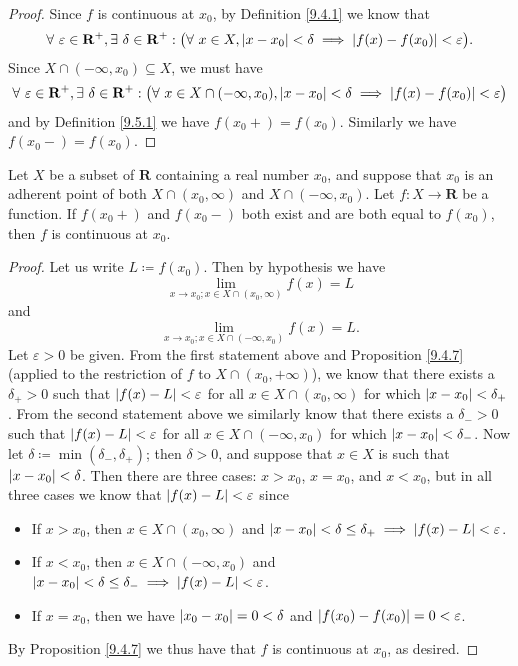 \begin{proof}
    Since \(f\) is continuous at \(x_0\), by Definition \ref{9.4.1} we know that
    \[
        \forall\ \varepsilon \in \mathbf{R}^+, \exists\ \delta \in \mathbf{R}^+ : \big(\forall\ x \in X, \abs*{x - x_0} < \delta \implies \abs*{f(x) - f(x_0)} < \varepsilon\big).
    \]
    Since \(X \cap (-\infty, x_0) \subseteq X\), we must have
    \[
        \forall\ \varepsilon \in \mathbf{R}^+, \exists\ \delta \in \mathbf{R}^+ : \big(\forall\ x \in X \cap (-\infty, x_0), \abs*{x - x_0} < \delta \implies \abs*{f(x) - f(x_0)} < \varepsilon\big)
    \]
    and by Definition \ref{9.5.1} we have \(f(x_0+) = f(x_0)\).
    Similarly we have \(f(x_0-) = f(x_0)\).
\end{proof}

\setcounter{theorem}{2}
\begin{proposition}\label{9.5.3}
    Let \(X\) be a subset of \(\mathbf{R}\) containing a real number \(x_0\), and suppose that \(x_0\) is an adherent point of both \(X \cap (x_0, \infty)\) and \(X \cap (-\infty, x_0)\).
    Let \(f : X \to \mathbf{R}\) be a function.
    If \(f(x_0+)\) and \(f(x_0-)\) both exist and are both equal to \(f(x_0)\), then \(f\) is continuous at \(x_0\).
\end{proposition}

\begin{proof}
    Let us write \(L \coloneqq f(x_0)\).
    Then by hypothesis we have
    \[
        \lim_{x \to x_0 ; x \in X \cap (x_0, \infty)} f(x) = L
    \]
    and
    \[
        \lim_{x \to x_0 ; x \in X \cap (-\infty, x_0)} f(x) = L.
    \]
    Let \(\varepsilon > 0\) be given.
    From the first statement above and Proposition \ref{9.4.7} (applied to the restriction of \(f\) to \(X \cap (x_0, +\infty)\)), we know that there exists a \(\delta_+ > 0\) such that \(\abs*{f(x) - L} < \varepsilon\) for all \(x \in X \cap(x_0, \infty)\) for which \(\abs*{x - x_0} < \delta_+\).
    From the second statement above we similarly know that there exists a \(\delta_- > 0\) such that \(\abs*{f(x) - L} < \varepsilon\) for all \(x \in X \cap (-\infty, x_0)\) for which \(\abs*{x - x_0} < \delta_-\).
    Now let \(\delta \coloneqq \min(\delta_-, \delta_+)\);
    then \(\delta > 0\), and suppose that \(x \in X\) is such that \(\abs*{x - x_0} < \delta\).
    Then there are three cases:
    \(x > x_0\), \(x = x_0\), and \(x < x_0\), but in all three cases we know that \(\abs*{f(x) - L} < \varepsilon\) since
    \begin{itemize}
        \item If \(x > x_0\), then \(x \in X \cap (x_0, \infty)\) and \(\abs*{x - x_0} < \delta \leq \delta_+ \implies \abs*{f(x) - L} < \varepsilon\).
        \item If \(x < x_0\), then \(x \in X \cap (-\infty, x_0)\) and \(\abs*{x - x_0} < \delta \leq \delta_- \implies \abs*{f(x) - L} < \varepsilon\).
        \item If \(x = x_0\), then we have \(\abs*{x_0 - x_0} = 0 < \delta\) and \(\abs*{f(x_0) - f(x_0)} = 0 < \varepsilon\).
    \end{itemize}
    By Proposition \ref{9.4.7} we thus have that \(f\) is continuous at \(x_0\), as desired.
\end{proof}


